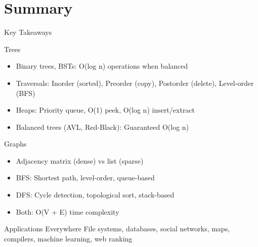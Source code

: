 \documentclass[aspectratio=169,xcolor=dvipsnames]{beamer}
\begin{document}
\section{Summary}

\begin{frame}{Key Takeaways}
  \begin{block}{Trees}
    \begin{itemize}
      \item Binary trees, BSTs: O(log n) operations when balanced
      \item Traversals: Inorder (sorted), Preorder (copy), Postorder (delete), Level-order (BFS)
      \item Heaps: Priority queue, O(1) peek, O(log n) insert/extract
      \item Balanced trees (AVL, Red-Black): Guaranteed O(log n)
    \end{itemize}
  \end{block}

  \begin{block}{Graphs}
    \begin{itemize}
      \item Adjacency matrix (dense) vs list (sparse)
      \item BFS: Shortest path, level-order, queue-based
      \item DFS: Cycle detection, topological sort, stack-based
      \item Both: O(V + E) time complexity
    \end{itemize}
  \end{block}

  \begin{block}{Applications Everywhere}
    File systems, databases, social networks, maps, compilers, machine learning, web ranking
  \end{block}
\end{frame}
\end{document}

